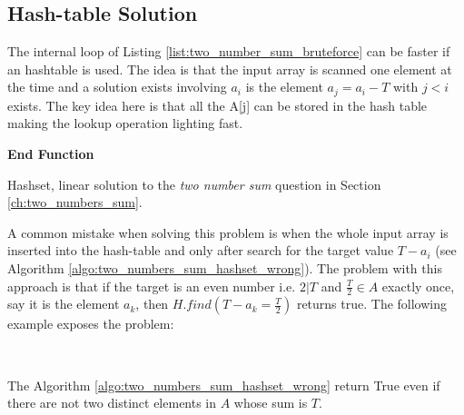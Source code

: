 \subsection{Hash-table Solution}
The internal loop of Listing \ref{list:two_number_sum_bruteforce} can be faster if an hashtable is used. The idea is that the input array is scanned one element at the time and a solution exists involving $a_i$ is the element $a_j  = a_i-T$ with $j < i$ exists. The key idea here is that all the A[j] can be stored in the hash table making the lookup operation lighting fast. 

\begin{algorithm}[H]
	
    \textbf{End Function}

	\label{algo:two_number_sum_hashset}
	\caption{Hashset, linear solution to the \textit{two number sum} question in Section \ref{ch:two_numbers_sum}.}
\end{algorithm}





A common mistake when solving this problem is when the whole input array is inserted into the hash-table and only after search for the target value $T-a_i$ (see Algorithm \ref{algo:two_numbers_sum_hashset_wrong}). The problem with this approach is that if the target is an even number i.e. $ 2 | T$ and $\frac{T}{2} \in A$ exactly once, say it is the element $a_k$, then $H.find(T-a_k=\frac{T}{2})$ returns true. The following example exposes the problem:
\begin{example}
	\\ \hfill
	\begin{itemize}
		\item[] $A=\{1,2,5,4}\}$
	\item[] $T = 10$
\end{itemize}
The Algorithm \ref{algo:two_numbers_sum_hashset_wrong} return True even if there are not two distinct elements in $A$ whose sum is $T$.
\end{example}



